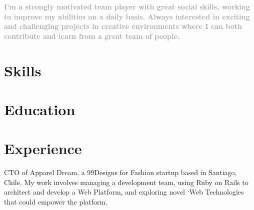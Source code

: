 \documentclass[10pt, a4paper, dvips]{moderncv}
\begin{document}
\maketitle

\begin{small}
\textcolor{darkgray}{
\textbf{I'm a strongly motivated team player with great social skills, working to improve my abilities on a daily basis. Always interested in exciting and challenging projects in creative environments where I can
both contribute and learn from a great team of people.}}
\end{small}

\section{Skills}


\section{Education}

\section{Experience}

{
\begin{scriptsize}
CTO of Apparel Dream, a 99Designs for Fashion startup based in Santiago, Chile. My work involves managing a development team, using Ruby on Rails to architect and develop a Web Platform, and exploring novel `Web Technologies that could empower the platform.\\
\end{scriptsize}
}
\end{document}

